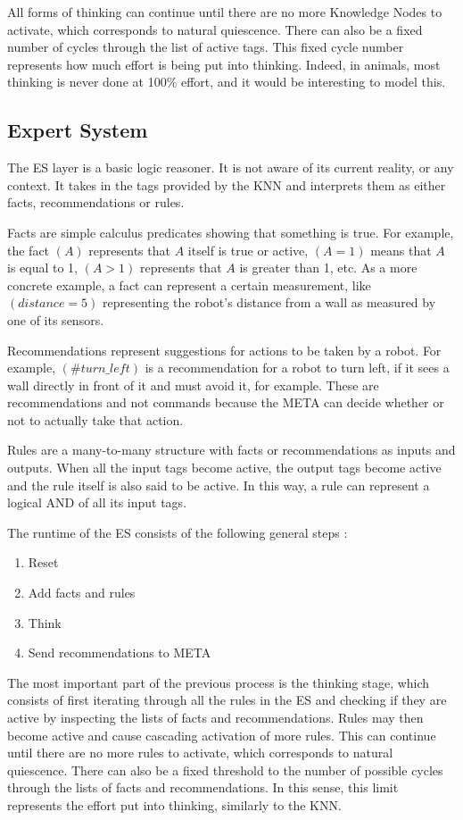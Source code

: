 \documentclass[titlepage,11pt]{article}
\begin{document}
All forms of thinking can continue until there are no more Knowledge Nodes to activate, which corresponds to natural quiescence. There can also be a fixed number of cycles through the list of active tags. This fixed cycle number represents how much effort is being put into thinking. Indeed, in animals, most thinking is never done at 100\% effort, and it would be interesting to model this.

\subsection{Expert System}

The ES layer is a basic logic reasoner. It is not aware of its current reality, or any context. It takes in the tags provided by the KNN and interprets them as either facts, recommendations or rules.

Facts are simple calculus predicates showing that something is true. For example, the fact $(A)$ represents that $A$ itself is true or active, $(A = 1)$ means that $A$ is equal to 1, $(A > 1)$ represents that $A$ is greater than 1, etc. As a more concrete example, a fact can represent a certain measurement, like $(distance = 5)$ representing the robot's distance from a wall as measured by one of its sensors.

Recommendations represent suggestions for actions to be taken by a robot. For example, $(\#turn\_left)$ is a recommendation for a robot to turn left, if it sees a wall directly in front of it and must avoid it, for example. These are recommendations and not commands because the META can decide whether or not to actually take that action.

Rules are a many-to-many structure with facts or recommendations as inputs and outputs. When all the input tags become active, the output tags become active and the rule itself is also said to be active. In this way, a rule can represent a logical AND of all its input tags.

The runtime of the ES consists of the following general steps \cite{vybihal-expert}:

\begin{enumerate}
	\item Reset
	\item Add facts and rules
	\item Think
	\item Send recommendations to META
\end{enumerate}

The most important part of the previous process is the thinking stage, which consists of first iterating through all the rules in the ES and checking if they are active by inspecting the lists of facts and recommendations. Rules may then become active and cause cascading activation of more rules. This can continue until there are no more rules to activate, which corresponds to natural quiescence. There can also be a fixed threshold to the number of possible cycles through the lists of facts and recommendations. In this sense, this limit represents the effort put into thinking, similarly to the KNN.
\end{document}
